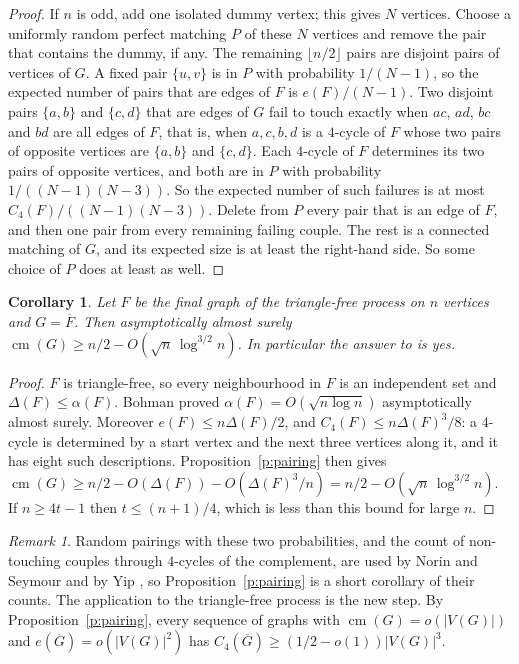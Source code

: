 \documentclass[11pt]{article}
\newtheorem{corollary}[theorem]{Corollary}
\theoremstyle{definition}\newtheorem{conjecture}[theorem]{Conjecture}
\theoremstyle{remark}\newtheorem{remark}[theorem]{Remark}
\newcommand{\cm}{\operatorname{cm}}
\begin{document}
\begin{proof}
If $n$ is odd, add one isolated dummy vertex; this gives $N$ vertices. Choose a uniformly random perfect matching $P$ of
these $N$ vertices and remove the pair that contains the dummy, if any. The remaining $\lfloor n/2\rfloor$ pairs are
disjoint pairs of vertices of $G$. A fixed pair $\{u,v\}$ is in $P$ with probability $1/(N-1)$, so the expected number of
pairs that are edges of $F$ is $e(F)/(N-1)$. Two disjoint pairs $\{a,b\}$ and $\{c,d\}$ that are edges of $G$ fail to touch
exactly when $ac$, $ad$, $bc$ and $bd$ are all edges of $F$, that is, when $a,c,b,d$ is a $4$-cycle of $F$ whose two pairs of
opposite vertices are $\{a,b\}$ and $\{c,d\}$. Each $4$-cycle of $F$ determines its two pairs of opposite vertices, and both
are in $P$ with probability $1/((N-1)(N-3))$. So the expected number of such failures is at most $C_4(F)/((N-1)(N-3))$.
Delete from $P$ every pair that is an edge of $F$, and then one pair from every remaining failing couple. The rest is a
connected matching of $G$, and its expected size is at least the right-hand side. So some choice of $P$ does at least as
well.
\end{proof}

\begin{corollary}\label{c:tfp}
Let $F$ be the final graph of the triangle-free process on $n$ vertices and $G=\overline F$. Then asymptotically almost
surely $\cm(G)\ge n/2-O(\sqrt n\,\log^{3/2}n)$. In particular the answer to \cite[Question~4.8]{CLWY} is yes.
\end{corollary}

\begin{proof}
$F$ is triangle-free, so every neighbourhood in $F$ is an independent set and $\Delta(F)\le\alpha(F)$. Bohman \cite{Boh}
proved $\alpha(F)=O(\sqrt{n\log n})$ asymptotically almost surely. Moreover $e(F)\le n\Delta(F)/2$, and
$C_4(F)\le n\Delta(F)^3/8$: a $4$-cycle is determined by a start vertex and the next three vertices along it, and it has eight
such descriptions. Proposition~\ref{p:pairing} then gives $\cm(G)\ge n/2-O(\Delta(F))-O(\Delta(F)^3/n)
=n/2-O(\sqrt n\,\log^{3/2}n)$. If $n\ge4t-1$ then $t\le(n+1)/4$, which is less than this bound for large $n$.
\end{proof}

\begin{remark}
Random pairings with these two probabilities, and the count of non-touching couples through $4$-cycles of the complement,
are used by Norin and Seymour \cite{NS} and by Yip \cite{Yip}, so Proposition~\ref{p:pairing} is a short corollary of
their counts. The application to the triangle-free process is the new step.
By Proposition~\ref{p:pairing}, every sequence of graphs with $\cm(G)=o(|V(G)|)$ and $e(\overline G)=o(|V(G)|^2)$ has
$C_4(\overline G)\ge(1/2-o(1))|V(G)|^3$.
\end{remark}
\end{document}
